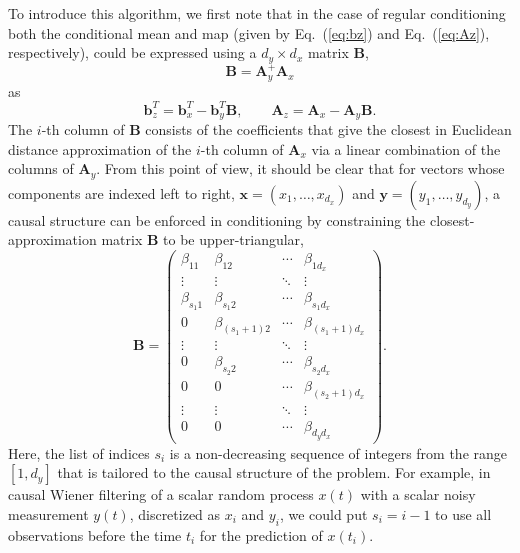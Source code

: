 \documentclass[a4paper,notitlepage]{article}
\renewcommand{\b}[1]{\mathbf{#1}}
\renewcommand{\eqref}[1]{Eq.~(\ref{#1})}
\begin{document}
To introduce this algorithm, we first note that in the case of regular conditioning both the conditional mean and map (given by \eqref{eq:bz} and \eqref{eq:Az}, respectively), could be expressed using a $d_y\times d_x$ matrix $\b{B}$, 
\begin{equation}
\b{B}=\b{A}^{+}_y\b{A}_x
\end{equation}
as
\begin{equation}
\b{b}_z^T=\b{b}_{x}^T-\b{b}_y^T \b{B},\qquad
\b{A}_z=\b{A}_x-\b{A}_y\b{B}.
\end{equation}
The $i$-th column of $\b{B}$ consists of the coefficients that give the closest in Euclidean distance approximation of the $i$-th column of $\b{A}_x$ via a linear combination of the columns of $\b{A}_y$. 
From this point of view, it should be clear that for vectors whose components are indexed left to right, $\b{x}=(x_1, \ldots, x_{d_x})$ and $\b{y}=(y_1, \ldots, y_{d_y})$, a causal structure can be enforced in conditioning by constraining the closest-approximation matrix $\b{B}$ to be upper-triangular,
\begin{equation}\label{eq:Bstruct}
\b{B}=\begin{pmatrix}
\beta_{11} & \beta_{12} & \cdots & \beta_{1d_{x}}\\
\vdots & \vdots & \ddots & \vdots\\
\beta_{s_{1}1} & \beta_{s_{1}2} & \cdots & \beta_{s_{1}d_{x}}\\
0 & \beta_{(s_{1}+1)2} & \cdots & \beta_{(s_{1}+1)d_{x}}\\
\vdots & \vdots & \ddots & \vdots\\
0 & \beta_{s_{2}2} & \cdots &  \beta_{s_{2}d_{x}}\\
0 & 0 & \cdots & \beta_{(s_{2}+1)d_{x}} \\
\vdots & \vdots & \ddots & \vdots\\
0 & 0 & \cdots & \beta_{d_{y}d_{x}} 
\end{pmatrix}.
\end{equation}
Here, the list of indices $s_{i}$ is a non-decreasing sequence of integers from the range $[1, d_y]$ that is tailored to the causal structure of the problem. For example, in causal Wiener filtering of a scalar random process $x(t)$ with a scalar noisy measurement $y(t)$, discretized as $x_i$ and $y_i$, we could put $s_i=i-1$ to use all observations before the time $t_i$ for the prediction of $x(t_i)$. 
\end{document}
